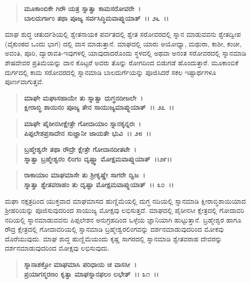 \begin{verse}
\textbf{ಮೂಕಾಂಬಿಕೇ ಗಿರೌ‌ ಯತ್ರ ಸ್ನಾತ್ವಾ ಕಾಮಸರೋವರೇ~।}\\\textbf{ಬಾಲದುರ್ಗಾಂ ತಥಾ ಪೂಜ್ಯ ಸರ್ವಸಿದ್ಧಿಮವಾಪ್ನುಯಾತ್~।। ೨೬~।।}
\end{verse}

ಮಾಘ ಶುದ್ಧ ಚತುರ್ದಶಿಯಲ್ಲಿ ಶ್ವೇತನಾಯಕ ಪರ್ವತದಲ್ಲಿ ಶ್ವೇತ ಸರೋವರದಲ್ಲಿ ಸ್ನಾನ ಮಾಡುವವನು ಶ್ವೇತದ್ವೀಪ (ವೈಕುಂಠದ ಒಂದು ಭಾಗ) ದಲ್ಲಿ ವಾಸ ಮಾಡುತ್ತಾನೆ. ಮಾಘದಲ್ಲಿ ಯಾರು ಅಯೋಧ್ಯಾ, ಮಥುರಾ, ಕಾಶೀ, ಕಂಚೀ, ಅವಂತಿ, ಪೂರಿ, ದ್ವಾರಾವತಿ-ಇವುಗಳಲ್ಲಿ ಯಾವುದಾದರೊಂದು ಸ್ಥಳದಲ್ಲಿ ಅಥವಾ ಅನಂತ ಸರೋವರದಲ್ಲಿ ಸ್ನಾನಮಾಡಿ ಶೇಷದೇವರ ಪ್ರತಿಮೆಯನ್ನು ದಾನ ಕೊಟ್ಟರೆ ಅವರು ತೊನ್ನು ರೋಗದಿಂದ ಬಿಡುಗಡೆ ಹೊಂದುತ್ತಾರೆ. ಮೂಕಾಂಬಿಕೆ ದುರ್ಗದಲ್ಲಿ ಕಾಮ ಸರೋವರದಲ್ಲಿ ಸ್ನಾನಮಾಡಿ ಬಾಲದುರ್ಗೆಯನ್ನು ಪೂಜಿಸಿದರೆ ಸಕಲ ಇಷ್ಟಾರ್ಥಗಳೂ ಪೂರ್ಣವಾಗುತ್ತವೆ.

\begin{verse}
\textbf{ಮಾಘೇ ಮಘಾಸಹಾಯೇ ತು ಸ್ನಾತ್ವಾ ದುಗ್ಧನದೀಜಲೇ~।}\\\textbf{ಕ್ಷೀರಾಬ್ಧಿ ಶಾಯಿನಂ ಪೂಜ್ಯ ತೇನ ಸಾಯುಜ್ಯಮಾಪ್ನುಯಾತ್~।। ೨೭~।।}
\end{verse}

\begin{verse}
\textbf{ಮಾಘೇ ಪೈಠೀನಸೀಕ್ಷೇತ್ರೇ ಗೋದಾಯಾಂ ಸ್ನಾನಕೃನ್ನರಃ~।}\\\textbf{ಪಿಪ್ಪಲೇಶಪ್ರಸಾದೇನ ಸುಜ್ಞಾನೀ ಜಾಯತೇ ಭುವಿ~।। ೨೮~।। }
\end{verse}

\begin{verse}
\textbf{ಬ್ರಹ್ಮೇಶ್ವರೇ ತಥಾ ರೌದ್ರೇ ಕ್ಷೇತ್ರೇ ಗೋದಾನದೀತಟೇ~।}\\\textbf{ಸ್ನಾತ್ವಾ ಬ್ರಹ್ಮೇಶ್ವರಂ ಲಿಂಗಂ ದೃಷ್ಟ್ವಾ ಮೋಕ್ಷಮವಾಪ್ನುಯಾತ್~।।೨೯।।} 
\end{verse}

\begin{verse}
\textbf{ರಾಕಾಯಾಂ ಮಾಘಮಾಸೇ ತು ಶ‍್ರೀಕೃಷ್ಣೇ ಸಾಗರೇ ದ್ವಿಜ~।}\\\textbf{ಸ್ನಾತ್ವಾ ಶ್ವೇತವರಾಹಂ ತು ದೃಷ್ಟಾ ಮೋಕ್ಷಮವಾಪ್ನುಯಾತ್~।। ೩೦~।।}
\end{verse}

ಮಘಾ ನಕ್ಷತ್ರದಿಂದ ಯುಕ್ತವಾದ ಮಾಘಮಾಸದ ಹುಣ್ಣಿಮೆಯಲ್ಲಿ ದುಗ್ಧ ನದಿಯಲ್ಲಿ ಸ್ನಾನಮಾಡಿ ಕ್ಷೀರಾಬ್ಧಿಶಾಯಿಯಾದ ಶ‍್ರೀಹರಿಯನ್ನು ಪೂಜಿಸುವುದರಿಂದ ಸಾಯುಜ್ಯ ಮೋಕ್ಷವು ಲಭಿಸುತ್ತದೆ. ಮಾಘದಲ್ಲಿ ಪೈಠೀನಸೀ ಕ್ಷೇತ್ರದಲ್ಲಿ ಗೋದಾವರಿ ನದಿಯಲ್ಲಿ ಸ್ನಾನಮಾಡುವವನು ಪಿಪ್ಪಲೇಶನ ಅನುಗ್ರಹದಿಂದ ಒಳ್ಳೆಯ ಜ್ಞಾನಿಯಾಗಿ ಹುಟ್ಟುತ್ತಾನೆ. ಬ್ರಹ್ಮೇಶ್ವರ ಹಾಗೂ ರೌದ್ರ ಕ್ಷೇತ್ರದಲ್ಲಿ ಗೋದಾವರಿಯಲ್ಲಿ ಸ್ನಾನಮಾಡಿ ಬ್ರಹ್ಮೇಶ್ವರಲಿಂಗವನ್ನು ದರ್ಶನಮಾಡುವುದರಿಂದ ಮೋಕವು ದೊರೆಯುವುದು. ಮಾಘ ಶುದ್ಧ ಹುಣ್ಣಿಮೆಯಂದು ಕೃಷ್ಣ ಸಾಗರದಲ್ಲಿ ಸ್ನಾನಮಾಡಿ ಶ್ವೇತವರಾಹ ದೇವರನ್ನು ದರ್ಶನಮಾಡುವುದರಿಂದ ಮೋಕ್ಷವು ಲಭಿಸುವುದು.

\begin{verse}
\textbf{ಸ್ನಾನಾಶಕ್ತೋ ಮಾಘಮಾಸಿ ಪರಿಧಾಯ ಚ ವಾಸಸೀ~।}\\\textbf{ಪ್ರಯಾಗಸ್ಮರಣಂ ಕೃತ್ವಾ ಮಾಘಸ್ನಾನಫಲಂ ಲಭೇತ್~।। ೩೧~।। }
\end{verse}

